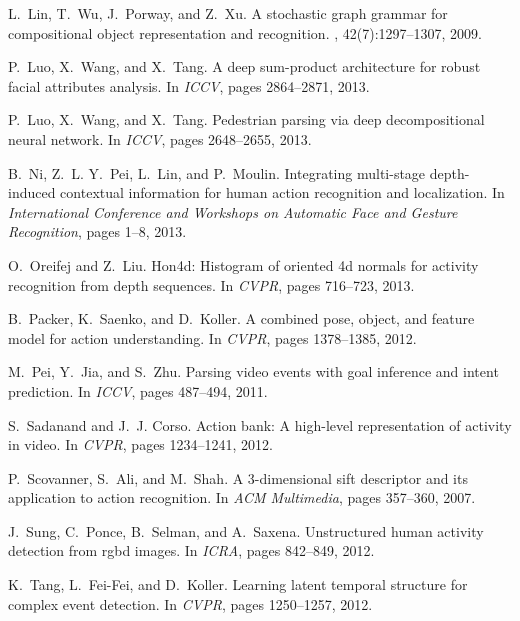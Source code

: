 \documentclass{sig-alternate}
\begin{document}
\begin{thebibliography}{40}
L.~Lin, T.~Wu, J.~Porway, and Z.~Xu.
\newblock A stochastic graph grammar for compositional object representation
  and recognition.
, 42(7):1297--1307, 2009.

P.~Luo, X.~Wang, and X.~Tang.
\newblock A deep sum-product architecture for robust facial attributes
  analysis.
\newblock In {\em ICCV}, pages 2864--2871, 2013.

P.~Luo, X.~Wang, and X.~Tang.
\newblock Pedestrian parsing via deep decompositional neural network.
\newblock In {\em ICCV}, pages 2648--2655, 2013.

B.~Ni, Z.~L. Y.~Pei, L.~Lin, and P.~Moulin.
\newblock Integrating multi-stage depth-induced contextual information for
  human action recognition and localization.
\newblock In {\em International Conference and Workshops on Automatic Face and
  Gesture Recognition}, pages 1--8, 2013.

O.~Oreifej and Z.~Liu.
\newblock Hon4d: Histogram of oriented 4d normals for activity recognition from
  depth sequences.
\newblock In {\em CVPR}, pages 716--723, 2013.

B.~Packer, K.~Saenko, and D.~Koller.
\newblock A combined pose, object, and feature model for action understanding.
\newblock In {\em CVPR}, pages 1378--1385, 2012.

M.~Pei, Y.~Jia, and S.~Zhu.
\newblock Parsing video events with goal inference and intent prediction.
\newblock In {\em ICCV}, pages 487--494, 2011.

S.~Sadanand and J.~J. Corso.
\newblock Action bank: A high-level representation of activity in video.
\newblock In {\em CVPR}, pages 1234--1241, 2012.

P.~Scovanner, S.~Ali, and M.~Shah.
\newblock A 3-dimensional sift descriptor and its application to action
  recognition.
\newblock In {\em ACM Multimedia}, pages 357--360, 2007.

J.~Sung, C.~Ponce, B.~Selman, and A.~Saxena.
\newblock Unstructured human activity detection from rgbd images.
\newblock In {\em ICRA}, pages 842--849, 2012.

K.~Tang, L.~Fei-Fei, and D.~Koller.
\newblock Learning latent temporal structure for complex event detection.
\newblock In {\em CVPR}, pages 1250--1257, 2012.


\end{thebibliography}
\end{document}
